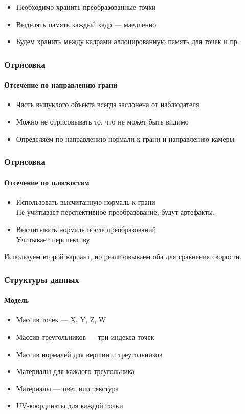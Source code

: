 \documentclass{beamer}
\begin{document}
\begin{frame}
\begin{frame}
\begin{itemize}
\item Необходимо хранить преобразованные точки
\item Выделять память каждый кадр --- маедленно
\item Будем хранить между кадрами аллоцированную память для точек и пр.
\end{itemize}
\end{frame}

\begin{frame}
\frametitle{Отрисовка}
\framesubtitle{Отсечение по направлению грани}

\begin{itemize}
\item Часть выпуклого объекта всегда заслонена от наблюдателя
\item Можно не отрисовывать то, что не может быть видимо
\item Определяем по направлению нормали к грани и направлению камеры
\end{itemize}
\end{frame}

\begin{frame}
\frametitle{Отрисовка}
\framesubtitle{Отсечение по плоскостям}

\begin{itemize}
\item Использовать высчитанную нормаль к грани \\
Не учитывает перспективное преобразование, будут артефакты.
\item Высчитывать нормаль после преобразований \\
Учитывает перспективу
\end{itemize}
Используем второй вариант, но реализовываем оба для сравнения скорости.
\end{frame}







\begin{frame}
\frametitle{Структуры данных}
\framesubtitle{Модель}

\begin{itemize}
\item Массив точек --- X, Y, Z, W
\item Массив треугольников --- три индекса точек
\item Массив нормалей для вершин и треугольников
\item Материалы для каждого треугольника
\item Материалы --- цвет или текстура
\item UV-координаты для каждой точки
\end{itemize}
\end{frame}


\end{frame}
\end{document}
